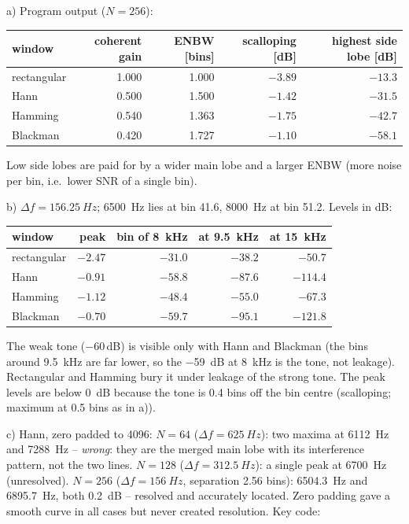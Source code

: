 \begin{solution}
a) Program output ($N=256$):
\begin{center}\small
\begin{tabular}{lrrrr}
\toprule
window & coherent gain & ENBW [bins] & scalloping [dB] & highest side lobe [dB]\\
\midrule
rectangular & 1.000 & 1.000 & $-3.89$ & $-13.3$\\
Hann & 0.500 & 1.500 & $-1.42$ & $-31.5$\\
Hamming & 0.540 & 1.363 & $-1.75$ & $-42.7$\\
Blackman & 0.420 & 1.727 & $-1.10$ & $-58.1$\\
\bottomrule
\end{tabular}
\end{center}
Low side lobes are paid for by a wider main lobe and a larger ENBW (more noise
per bin, i.e.\ lower SNR of a single bin).

b) $\Delta f=\SI{156.25}{Hz}$; \SI{6500}{Hz} lies at bin 41.6, \SI{8000}{Hz} at bin
51.2. Levels in dB:
\begin{center}\small
\begin{tabular}{lrrrr}
\toprule
window & peak & bin of \SI{8}{kHz} & at \SI{9.5}{kHz} & at \SI{15}{kHz}\\
\midrule
rectangular & $-2.47$ & $-31.0$ & $-38.2$ & $-50.7$\\
Hann & $-0.91$ & $-58.8$ & $-87.6$ & $-114.4$\\
Hamming & $-1.12$ & $-48.4$ & $-55.0$ & $-67.3$\\
Blackman & $-0.70$ & $-59.7$ & $-95.1$ & $-121.8$\\
\bottomrule
\end{tabular}
\end{center}
The weak tone ($-60$\,dB) is visible only with Hann and Blackman (the bins
around \SI{9.5}{kHz} are far lower, so the \SI{-59}{dB} at \SI{8}{kHz} is the
tone, not leakage). Rectangular and Hamming bury it under leakage of the strong
tone. The peak levels are below \SI{0}{dB} because the tone is 0.4 bins off the
bin centre (scalloping; maximum at 0.5 bins as in a)).

c) Hann, zero padded to 4096:
$N=64$ ($\Delta f=\SI{625}{Hz}$): two maxima at \SI{6112}{Hz} and \SI{7288}{Hz} --
\emph{wrong}: they are the merged main lobe with its interference pattern, not
the two lines. $N=128$ ($\Delta f=\SI{312.5}{Hz}$): a single peak at
\SI{6700}{Hz} (unresolved). $N=256$ ($\Delta f=\SI{156}{Hz}$, separation 2.56
bins): \SI{6504.3}{Hz} and \SI{6895.7}{Hz}, both \SI{0.2}{dB} -- resolved and
accurately located. Zero padding gave a smooth curve in all cases but never
created resolution. Key code:


\end{solution}
